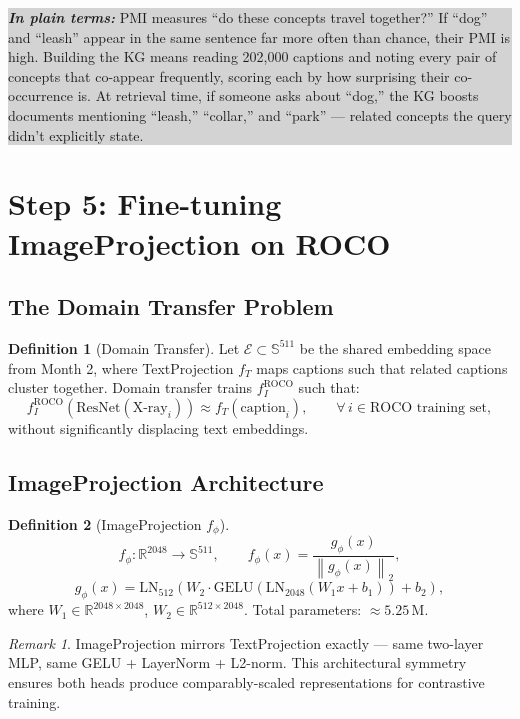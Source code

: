 \documentclass[12pt, a4paper]{article}
\theoremstyle{definition}
\newtheorem{definition}{Definition}[section]
\theoremstyle{plain}
\theoremstyle{remark}
\newtheorem{remark}{Remark}[section]
\newcommand{\R}{\mathbb{R}}
\newcommand{\Sphere}{\mathbb{S}}
\newcommand{\norm}[1]{\left\|#1\right\|_2}
\newcommand{\Emb}{\mathcal{E}}
\newcommand{\layman}[1]{%
  \vspace{4pt}%
  \noindent\colorbox{lightgray}{\parbox{\dimexpr\linewidth-2\fboxsep}{%
    \textbf{\textit{In plain terms:}} #1}}%
  \vspace{4pt}%
}
\begin{document}
\layman{PMI measures ``do these concepts travel together?'' If ``dog'' and ``leash'' appear in the same sentence far more often than chance, their PMI is high. Building the KG means reading 202,000 captions and noting every pair of concepts that co-appear frequently, scoring each by how surprising their co-occurrence is. At retrieval time, if someone asks about ``dog,'' the KG boosts documents mentioning ``leash,'' ``collar,'' and ``park'' --- related concepts the query didn't explicitly state.}

\section{Step 5: Fine-tuning ImageProjection on ROCO}
\label{sec:finetune}

\subsection{The Domain Transfer Problem}

\begin{definition}[Domain Transfer]
Let $\Emb \subset \Sphere^{511}$ be the shared embedding space from Month 2, where TextProjection $f_T$ maps captions such that related captions cluster together. Domain transfer trains $f_I^{\text{ROCO}}$ such that:
\[
f_I^{\text{ROCO}}\!\left(\text{ResNet}(\text{X-ray}_i)\right) \approx f_T(\text{caption}_i),
\qquad \forall\, i \in \text{ROCO training set},
\]
without significantly displacing text embeddings.
\end{definition}

\subsection{ImageProjection Architecture}

\begin{definition}[ImageProjection $f_\phi$]
\[
f_\phi: \R^{2048} \to \Sphere^{511}, \qquad
f_\phi(x) = \frac{g_\phi(x)}{\norm{g_\phi(x)}},
\]
\[
g_\phi(x) = \text{LN}_{512}\!\left(W_2 \cdot \text{GELU}\!\left(\text{LN}_{2048}(W_1 x + b_1)\right) + b_2\right),
\]
where $W_1 \in \R^{2048 \times 2048}$, $W_2 \in \R^{512 \times 2048}$. Total parameters: $\approx 5.25\,\text{M}$.
\end{definition}

\begin{remark}
ImageProjection mirrors TextProjection exactly --- same two-layer MLP, same GELU + LayerNorm + L2-norm. This architectural symmetry ensures both heads produce comparably-scaled representations for contrastive training.
\end{remark}
\end{document}

